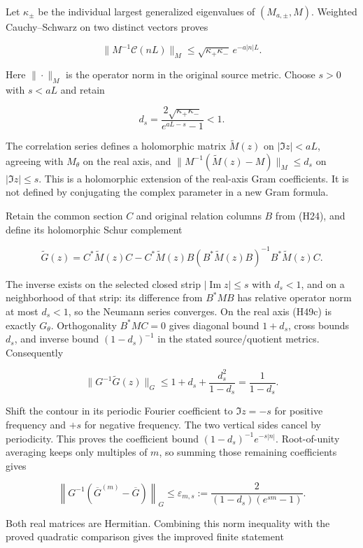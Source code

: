 \documentclass[
]{article}
\begin{document}
Let \(\kappa_\pm\) be the individual largest generalized eigenvalues of
\((M_{a,\pm},M)\). Weighted Cauchy--Schwarz on two distinct vectors
proves

\[
 \|M^{-1}\mathcal C(nL)\|_M
 \leq\sqrt{\kappa_+\kappa_-}\,e^{-a|n|L}.
 \tag{H49a}
\]

Here \(\|\cdot\|_M\) is the operator norm in the original source metric.
Choose \(s>0\) with \(s<aL\) and retain

\[
 d_s=\frac{2\sqrt{\kappa_+\kappa_-}}{e^{aL-s}-1}<1.
 \tag{H49b}
\]

The correlation series defines a holomorphic matrix \(\widetilde M(z)\)
on \(|\Im z|<aL\), agreeing with \(M_\theta\) on the real axis, and
\(\|M^{-1}(\widetilde M(z)-M)\|_M\leq d_s\) on \(|\Im z|\leq s\). This
is a holomorphic extension of the real-axis Gram coefficients. It is not
defined by conjugating the complex parameter in a new Gram formula.

Retain the common section \(C\) and original relation columns \(B\) from
(H24), and define its holomorphic Schur complement

\[
 \widetilde G(z)=C^*\widetilde M(z)C
 -C^*\widetilde M(z)B
 (B^*\widetilde M(z)B)^{-1}B^*\widetilde M(z)C.
 \tag{H49c}
\]

The inverse exists on the selected closed strip \(|\operatorname{Im}z|\le s\) with \(d_s<1\), and on a neighborhood of that strip: its difference from \(B^*MB\)
has relative operator norm at most \(d_s<1\), so the Neumann series
converges. On the real axis (H49c) is exactly \(G_\theta\).
Orthogonality \(B^*MC=0\) gives diagonal bound \(1+d_s\), cross bounds
\(d_s\), and inverse bound \((1-d_s)^{-1}\) in the stated
source/quotient metrics. Consequently

\[
 \|G^{-1}\widetilde G(z)\|_G
 \leq1+d_s+\frac{d_s^2}{1-d_s}
 =\frac1{1-d_s}.
 \tag{H49d}
\]

Shift the contour in its periodic Fourier coefficient to \(\Im z=-s\)
for positive frequency and \(+s\) for negative frequency. The two
vertical sides cancel by periodicity. This proves the coefficient bound
\((1-d_s)^{-1}e^{-s|n|}\). Root-of-unity averaging keeps only multiples
of \(m\), so summing those remaining coefficients gives

\[
 \left\|G^{-1}(\overline G^{(m)}-\overline G)\right\|_G
 \leq\varepsilon_{m,s}
 :=\frac{2}{(1-d_s)(e^{sm}-1)}.
 \tag{H49e}
\]

Both real matrices are Hermitian. Combining this norm inequality with
the proved quadratic comparison gives the improved finite statement
\end{document}
